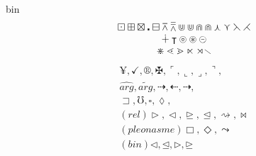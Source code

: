 \documentclass[11pt]{article}
\begin{document}
bin
$$
\begin{array}{c}
\boxdot\boxplus\boxtimes\centerdot\boxminus
\barwedge
\doublebarwedge
\Cup
\doublecup
\Cap
\doublecap
\curlywedge
\curlyvee
\leftthreetimes
\rightthreetimes\\
\dotplus
\intercal
\circledcirc
\circledast
\circleddash\\
\divideontimes
\lessdot
\gtrdot
\ltimes
\rtimes
\smallsetminus
\end{array}
$$
$$
\begin{array}{c}
\yen, \checkmark, \circledR, \maltese, \ulcorner, \llcorner, \lrcorner, \urcorner,\\
\widehat{arg}, \widetilde{arg}, \dashrightarrow, \dashleftarrow, \dasharrow,\\
\sqsupset, \mho, \square, \lozenge,\\
(rel) \vartriangleright, \vartriangleleft, \trianglerighteq, \trianglelefteq, \rightsquigarrow, \Join\\
(pleonasme) \Box, \Diamond, \leadsto\\
(bin) \lhd, \unlhd, \rhd, \unrhd
\end{array}
$$
\end{document}
